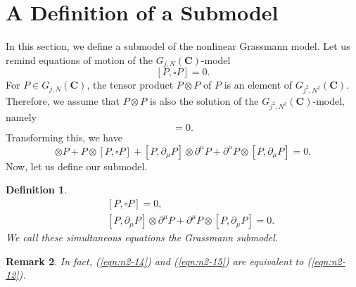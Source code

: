 \documentclass[makeidx,12pt,openany]{report}
\newtheorem{df}{Definition}[chapter]
\newtheorem{rmk}[df]{Remark}
\begin{document}
\section{A Definition of a Submodel}
In this section, we define a submodel of the nonlinear Grassmann model. 
Let us remind equations of motion of the $G_{j,N}(\mathbf{C})$-model
$$
[P,\square P]=0 .
$$
For $P \in G_{j,N}(\mathbf{C})$, the tensor product $P \otimes P$ of $P$ is 
an element of 
$G_{j^2,N^2}(\mathbf{C})$. Therefore, we assume that $P \otimes P$ 
is also the solution of the $G_{j^2,N^2}(\mathbf{C})$-model, namely
\begin{equation}
 [P \otimes P,\square (P \otimes P)]=0. 
 \label{eqn:n2-12}
\end{equation}
Transforming this, we have
\begin{equation}
 [P,\square P] \otimes P + P \otimes [P,\square P]
 +[P,\partial_{\mu}P] \otimes \partial^{\mu}P 
 +\partial^{\mu}P \otimes [P,\partial_{\mu}P]=0. 
\end{equation}
Now, let us define our submodel.
\begin{df}
\begin{eqnarray}
 &&[P,\square P]=0,
 \label{eqn:n2-14}\\
 &&[P,\partial_{\mu}P] \otimes \partial^{\mu}P 
 +\partial^{\mu}P \otimes [P,\partial_{\mu}P]=0. 
 \label{eqn:n2-15}
\end{eqnarray}
We call these simultaneous equations 
{\textit{the Grassmann submodel}}.
\end{df}
\begin{rmk}
In fact, (\ref{eqn:n2-14}) and (\ref{eqn:n2-15}) are equivalent to 
(\ref{eqn:n2-12}). 
\end{rmk}
\end{document}
